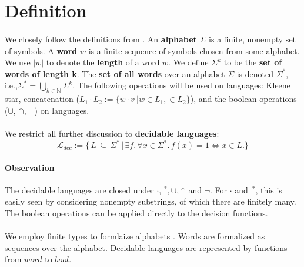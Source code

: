 \documentclass[11pt,a4paper,oneside]{book}
\begin{document}
    \section{Definition}
        \paragraph{}
        We closely follow the definitions from \cite{DBLP:books/daglib/0011126}.
        An \textbf{alphabet} $\Sigma$ is a finite, nonempty set of symbols. 
        A \textbf{word} $w$ is a finite sequence of symbols chosen from some alphabet. 
        We use $|w|$ to denote the \textbf{length} of a word $w$. 
        We define $\Sigma^k$ to be the \textbf{set of words of length k}.
        The \textbf{set of all words} over an alphabet $\Sigma$ is denoted $\Sigma^*$, i.e.,$\Sigma^* = \bigcup_{k \in \mathbb{N}} \Sigma^k$.
        The following operations will be used on languages: Kleene star, concatenation ($L_1 \cdot L_2 := \{w \cdot v\ \vert w \in L_1,  \in L_2\}$), and the boolean operations ($\cup$, $\cap$, $\neg$) on languages.

        
        \paragraph{} We restrict all further discussion to \textbf{decidable languages}:
        \[
            \mathcal{L}_{dec} := \{ \, L \, \subseteq \, \Sigma^* \, 
                \vert \, \exists f. \, \forall x \in \Sigma^*. \, f(x) = 1 \Leftrightarrow  x \in L. \}
        \] 

        \paragraph{Observation} 
            The decidable languages are closed under $\cdot, \,^*, \cup, \cap$ and $\neg$. 
            For $\cdot$ and $\,^*$, this is easily seen by considering nonempty substrings, of which there are finitely many. 
            The boolean operations can be applied directly to the decision functions.

        \paragraph{} 
            We employ finite types to formlaize alphabets . 
            Words are formalized as sequences over the alphabet.
            Decidable languages are represented by functions from $word$ to $bool$.
\end{document}
